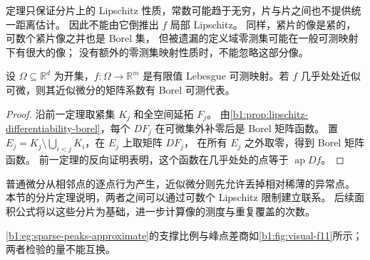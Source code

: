 定理只保证分片上的 Lipschitz 性质，常数可能趋于无穷，片与片之间也不提供统一距离估计。
因此不能由它倒推出 \(f\) 局部 Lipschitz。
同样，紧片的像是紧的，可数个紧片像之并也是 Borel 集，
但被遗漏的定义域零测集可能在一般可测映射下有很大的像；
没有额外的零测集映射性质时，不能忽略这部分像。

\begin{corollary}\label{b1:cor:approximate-derivative-measurable}
设 \(\Omega\subseteq\mathbb R^d\) 为开集，\(f:\Omega\to\mathbb R^m\) 是有限值 Lebesgue 可测映射。若 \(f\) 几乎处处近似可微，则其近似微分的矩阵系数有 Borel 可测代表。
\end{corollary}
\begin{proof}
沿前一定理取紧集 \(K_j\) 和全空间延拓 \(F_j\)。
由\cref{b1:prop:lipschitz-differentiability-borel}，每个 \(DF_j\)
在可微集外补零后是 Borel 矩阵函数。
置 \(E_j=K_j\setminus\bigcup_{i<j}K_i\)，在 \(E_j\) 上取矩阵 \(DF_j\)，
在所有 \(E_j\) 之外取零，得到 Borel 矩阵函数。
前一定理的反向证明表明，这个函数在几乎处处的点等于 \(\operatorname{ap}Df\)。
\end{proof}

普通微分从相邻点的逐点行为产生，近似微分则先允许丢掉相对稀薄的异常点。
本节的分片定理说明，两者之间可以通过可数个 Lipschitz 限制建立联系。
后续面积公式将以这些分片为基础，进一步计算像的测度与重复覆盖的次数。

\cref{b1:eg:sparse-peaks-approximate}的支撑比例与峰点差商如\cref{b1:fig:visual-f11}所示；两者检验的量不能互换。

